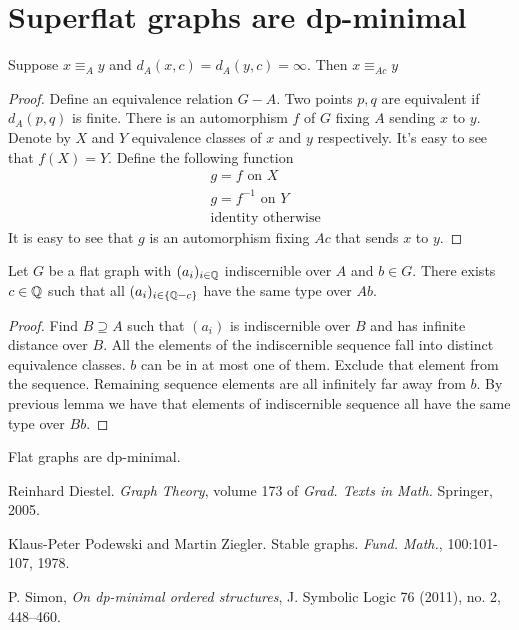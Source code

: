 \documentclass{amsart}
\begin{document}
\section{Superflat graphs are dp-minimal}

\begin{Lemma}
	Suppose $x \equiv_A y$ and $d_A(x, c) = d_A(y, c) = \infty$. Then $x \equiv_{Ac} y$
\end{Lemma}

\begin{proof}
	Define an equivalence relation $G - A$. Two points $p, q$ are equivalent if $d_A(p,q)$ is finite. There is an automorphism $f$ of $G$ fixing $A$ sending $x$ to $y$. Denote by $X$ and $Y$ equivalence classes of $x$ and $y$ respectively. It's easy to see that $f(X) = Y$. Define the following function
	\begin{align*}
		&g = f \text { on } X \\
		&g = f^{-1} \text { on } Y \\
		&\text{identity otherwise}
	\end{align*}
	It is easy to see that $g$ is an automorphism fixing $Ac$ that sends $x$ to $y$.
\end{proof}

\begin{Theorem}
	Let $G$ be a flat graph with $(a_i)_{i\in\mathbb{Q}}$ indiscernible over $A$ and $b \in G$. There exists $c \in \mathbb{Q}$ such that all $(a_i)_{i\in\{\mathbb{Q} - c\}}$ have the same type over $Ab$.
\end{Theorem}

\begin{proof}
	Find $B \supseteq A$ such that $(a_i)$ is indiscernible over $B$ and has infinite distance over $B$. All the elements of the indiscernible sequence fall into distinct equivalence classes. $b$ can be in at most one of them. Exclude that element from the sequence. Remaining sequence elements are all infinitely far away from $b$. By previous lemma we have that elements of indiscernible sequence all have the same type over $Bb$.
\end{proof}

\begin{Corollary}
	Flat graphs are dp-minimal.
\end{Corollary}

\begin{thebibliography}{9}


	Reinhard Diestel. \textit{Graph Theory}, volume 173 of \textit{Grad. Texts in Math.} Springer, 2005.

	Klaus-Peter Podewski and Martin Ziegler. Stable graphs. \textit{Fund. Math.}, 100:101-107, 1978.
	
	P. Simon, \textit{On dp-minimal ordered structures}, J. Symbolic Logic 76 (2011), no. 2, 448–460.

\end{thebibliography}
\end{document}
